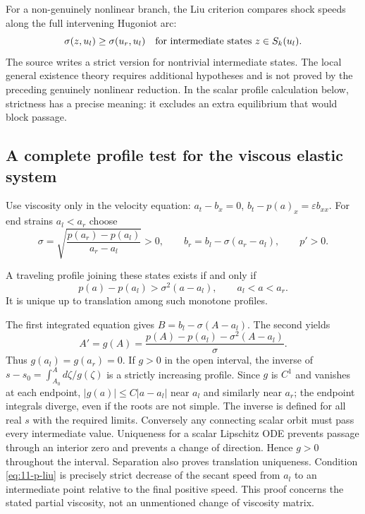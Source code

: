For a non-genuinely nonlinear branch, the Liu criterion compares
shock speeds along the full intervening Hugoniot arc:
\[
 \sigma(z,u_l)\ge\sigma(u_r,u_l)
 \quad\hbox{for intermediate states }z\in S_k(u_l).
\]
The source writes a strict version for nontrivial intermediate states.
The local general existence theory requires additional hypotheses and
is not proved by the preceding genuinely nonlinear reduction.
In the scalar profile calculation below, strictness has a precise
meaning: it excludes an extra equilibrium that would block passage.

\subsection{A complete profile test for the viscous elastic system}
Use viscosity only in the velocity equation:
$a_t-b_x=0$, $b_t-p(a)_x=\varepsilon b_{xx}$.
For end strains $a_l<a_r$ choose
\[
 \sigma=\sqrt{\frac{p(a_r)-p(a_l)}{a_r-a_l}}>0,\qquad
 b_r=b_l-\sigma(a_r-a_l),\qquad p'>0.
\]
\begin{theorem}
A traveling profile joining these states exists if and only if
\begin{equation}\label{eq:11-p-liu}
 p(a)-p(a_l)>\sigma^2(a-a_l),\qquad a_l<a<a_r.
\end{equation}
It is unique up to translation among such monotone profiles.
\end{theorem}
\begin{expandedproof}
The first integrated equation gives $B=b_l-\sigma(A-a_l)$.
The second yields
\[
 A'=g(A)=\frac{p(A)-p(a_l)-\sigma^2(A-a_l)}\sigma.
\]
Thus $g(a_l)=g(a_r)=0$. If $g>0$ in the open interval, the inverse
of $s-s_0=\int_{A_0}^{A}d\zeta/g(\zeta)$ is a strictly increasing
profile. Since $g$ is $C^1$ and vanishes at each endpoint,
$|g(a)|\le C|a-a_l|$ near $a_l$ and similarly near $a_r$;
the endpoint integrals diverge, even if the roots are not simple.
The inverse is defined for all real $s$ with the required limits.
Conversely any connecting scalar orbit must pass every intermediate
value. Uniqueness for a scalar Lipschitz ODE prevents passage through
an interior zero and prevents a change of direction. Hence $g>0$
throughout the interval. Separation also proves translation uniqueness.
Condition \eqref{eq:11-p-liu} is precisely strict decrease of the
secant speed from $a_l$ to an intermediate point relative to the
final positive speed. This proof concerns the stated partial viscosity,
not an unmentioned change of viscosity matrix.
\end{expandedproof}

